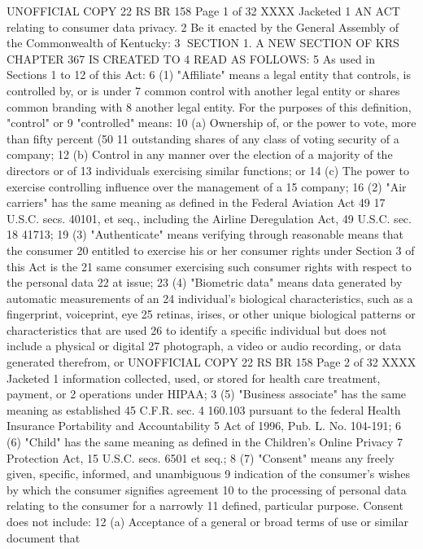 UNOFFICIAL COPY 22 RS BR 158
Page 1 of 32
XXXX Jacketed
1 AN ACT relating to consumer data privacy.
2 Be it enacted by the General Assembly of the Commonwealth of Kentucky:
3 SECTION 1. A NEW SECTION OF KRS CHAPTER 367 IS CREATED TO
4 READ AS FOLLOWS:
5 As used in Sections 1 to 12 of this Act:
6 (1) "Affiliate" means a legal entity that controls, is controlled by, or is under
7 common control with another legal entity or shares common branding with
8 another legal entity. For the purposes of this definition, "control" or
9 "controlled" means:
10 (a) Ownership of, or the power to vote, more than fifty percent (50%
11 outstanding shares of any class of voting security of a company;
12 (b) Control in any manner over the election of a majority of the directors or of
13 individuals exercising similar functions; or
14 (c) The power to exercise controlling influence over the management of a
15 company;
16 (2) "Air carriers" has the same meaning as defined in the Federal Aviation Act 49
17 U.S.C. secs. 40101, et seq., including the Airline Deregulation Act, 49 U.S.C. sec.
18 41713;
19 (3) "Authenticate" means verifying through reasonable means that the consumer
20 entitled to exercise his or her consumer rights under Section 3 of this Act is the
21 same consumer exercising such consumer rights with respect to the personal data
22 at issue;
23 (4) "Biometric data" means data generated by automatic measurements of an
24 individual's biological characteristics, such as a fingerprint, voiceprint, eye
25 retinas, irises, or other unique biological patterns or characteristics that are used
26 to identify a specific individual but does not include a physical or digital
27 photograph, a video or audio recording, or data generated therefrom, or 
UNOFFICIAL COPY 22 RS BR 158
Page 2 of 32
XXXX Jacketed
1 information collected, used, or stored for health care treatment, payment, or
2 operations under HIPAA;
3 (5) "Business associate" has the same meaning as established 45 C.F.R. sec.
4 160.103 pursuant to the federal Health Insurance Portability and Accountability
5 Act of 1996, Pub. L. No. 104-191;
6 (6) "Child" has the same meaning as defined in the Children's Online Privacy
7 Protection Act, 15 U.S.C. secs. 6501 et seq.;
8 (7) "Consent" means any freely given, specific, informed, and unambiguous
9 indication of the consumer's wishes by which the consumer signifies agreement
10 to the processing of personal data relating to the consumer for a narrowly
11 defined, particular purpose. Consent does not include:
12 (a) Acceptance of a general or broad terms of use or similar document that
